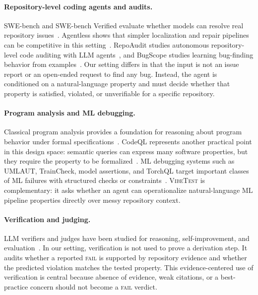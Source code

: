 \documentclass[11pt]{article}
\newcommand{\fail}{\textsc{fail}}
\newcommand{\vibetest}{\textsc{VibeTest}}
\begin{document}
\paragraph{Repository-level coding agents and audits.}
SWE-bench and SWE-bench Verified evaluate whether models can resolve real repository issues~\citep{jimenez2024swebench,swebench-verified}.
Agentless shows that simpler localization and repair pipelines can be competitive in this setting~\citep{xia2024agentless}.
RepoAudit studies autonomous repository-level code auditing with LLM agents~\citep{guo2025repoaudit}, and BugScope studies learning bug-finding behavior from examples~\citep{liu2025bugscope}.
Our setting differs in that the input is not an issue report or an open-ended request to find any bug.
Instead, the agent is conditioned on a natural-language property and must decide whether that property is satisfied, violated, or unverifiable for a specific repository.

\paragraph{Program analysis and ML debugging.}
Classical program analysis provides a foundation for reasoning about program behavior under formal specifications~\citep{cousot1979systematic,nielson1999principles}.
CodeQL represents another practical point in this design space: semantic queries can express many software properties, but they require the property to be formalized~\citep{codeql}.
ML debugging systems such as UMLAUT, TrainCheck, model assertions, and TorchQL target important classes of ML failures with structured checks or constraints~\citep{schoop2021umlaut,traincheck,kang2020assertions,naik2024torchql}.
\vibetest{} is complementary: it asks whether an agent can operationalize natural-language ML pipeline properties directly over messy repository context.

\paragraph{Verification and judging.}
LLM verifiers and judges have been studied for reasoning, self-improvement, and evaluation~\citep{cobbe2021verifier,lightman2024process,weng2023selfverification,madaan2023selfrefine,zheng2023judge,tan2025judgebench}.
In our setting, verification is not used to prove a derivation step.
It audits whether a reported \fail{} is supported by repository evidence and whether the predicted violation matches the tested property.
This evidence-centered use of verification is central because absence of evidence, weak citations, or a best-practice concern should not become a \fail{} verdict.
\end{document}

